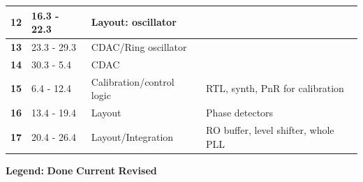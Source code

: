 \documentclass[t, screen, aspectratio=43]{beamer}
\begin{document}
\begin{frame}
\begin{table}[htb!]
\begin{tabular}{|c|l|l|l|}
			\hline 
			\rule[-1ex]{0pt}{2.5ex}\cellcolor{red!40}\textbf{12}&\cellcolor{red!40}16.3 - 22.3&\cellcolor{red!40}Layout: oscillator  &\cellcolor{red!40}\\ 
			\hline 
			\rule[-1ex]{0pt}{2.5ex}\cellcolor{red!40}\textbf{13}&\cellcolor{red!40}23.3 - 29.3&\cellcolor{red!40}CDAC/Ring oscillator   &\cellcolor{red!40}\\ 
			\hline 
			\rule[-1ex]{0pt}{2.5ex}\cellcolor{red!40}\textbf{14}&\cellcolor{red!40}30.3 - 5.4 &\cellcolor{red!40}CDAC &\cellcolor{red!40}\\ 
			\hline 
			\rule[-1ex]{0pt}{2.5ex}\cellcolor{red!40}\textbf{15}&\cellcolor{red!40}6.4 - 12.4&\cellcolor{red!40}{\color{red}\textbf{(Easter)}} Calibration/control logic &\cellcolor{red!40}RTL, synth, PnR for calibration\\ 
			\hline 
			\rule[-1ex]{0pt}{2.5ex}\cellcolor{red!40}\textbf{16}&\cellcolor{red!40}13.4 - 19.4&\cellcolor{red!40}Layout &\cellcolor{red!40}Phase detectors\\ 
			\hline 
			\rule[-1ex]{0pt}{2.5ex}\cellcolor{green!40}\textbf{17}&\cellcolor{green!40}20.4 - 26.4&\cellcolor{green!40}Layout/Integration &\cellcolor{green!40}RO buffer, level shifter, whole PLL\\ 
			\hline 
		\end{tabular}
		\begin{flushleft}\textbf{Legend:} \colorbox{red!20}{\textbf{Done}} \colorbox{green!20}{\textbf{Current}}  \colorbox{blue!20}{\textbf{Revised}}
		\end{flushleft}
	\end{table}   
\end{frame}
\end{document}

